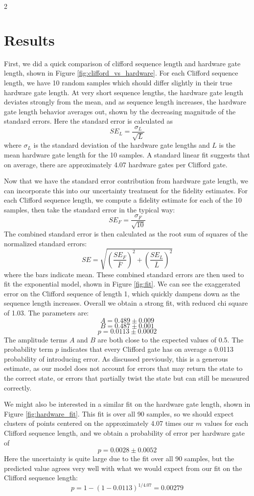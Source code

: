 \documentclass{article}
\begin{document}
\begin{multicols}{2}
\section{Results}
First, we did a quick comparison of clifford sequence length and hardware gate length, shown in Figure \ref{fig:clifford_vs_hardware}. For each Clifford sequence length, we have 10 random samples which should differ slightly in their true hardware gate length. At very short sequence lengths, the hardware gate length deviates strongly from the mean, and as sequence length increases, the hardware gate length behavior averages out, shown by the decreasing magnitude of the standard errors. Here the standard error is calculated as
\[SE_L = \frac{\sigma_L}{\sqrt{L}}\]
where $\sigma_L$ is the standard deviation of the hardware gate lengths and $L$ is the mean hardware gate length for the 10 samples. A standard linear fit suggests that on average, there are approximately 4.07 hardware gates per Clifford gate.



Now that we have the standard error contribution from hardware gate length, we can incorporate this into our uncertainty treatment for the fidelity estimates. For each Clifford sequence length, we compute a fidelity estimate for each of the 10 samples, then take the standard error in the typical way:
\[SE_F = \frac{\sigma_F}{\sqrt{10}}\]
The combined standard error is then calculated as the root sum of squares of the normalized standard errors:
\[SE = \sqrt{\left(\frac{SE_F}{\bar{F}}\right)^2 + \left(\frac{SE_L}{\bar{L}}\right)^2}\]
where the bars indicate mean. These combined standard errors are then used to fit the exponential model, shown in Figure \ref{fig:fit}. We can see the exaggerated error on the Clifford sequence of length 1, which quickly dampens down as the sequence length increases. Overall we obtain a strong fit, with reduced chi square of 1.03. The parameters are: 
\[A = 0.489 \pm 0.009\] 
\[B = 0.487 \pm 0.001\] 
\[p = 0.0113 \pm 0.0002\] 
The amplitude terms $A$ and $B$ are both close to the expected values of 0.5. The probability term $p$ indicates that every Clifford gate has on average a 0.0113 probability of introducing error. As discussed previously, this is a generous estimate, as our model does not account for errors that may return the state to the correct state, or errors that partially twist the state but can still be measured correctly.



We might also be interested in a similar fit on the hardware gate length, shown in Figure \ref{fig:hardware_fit}. This fit is over all 90 samples, so we should expect clusters of points centered on the approximately 4.07 times our $m$ values for each Clifford sequence length, and we obtain a probability of error per hardware gate of 
\[p = 0.0028 \pm 0.0052\]
Here the uncertainty is quite large due to the fit over all 90 samples, but the predicted value agrees very well with what we would expect from our fit on the Clifford sequence length:
\[p = 1 - (1-0.0113)^{1/4.07} = 0.00279\]




\end{multicols}
\end{document}
